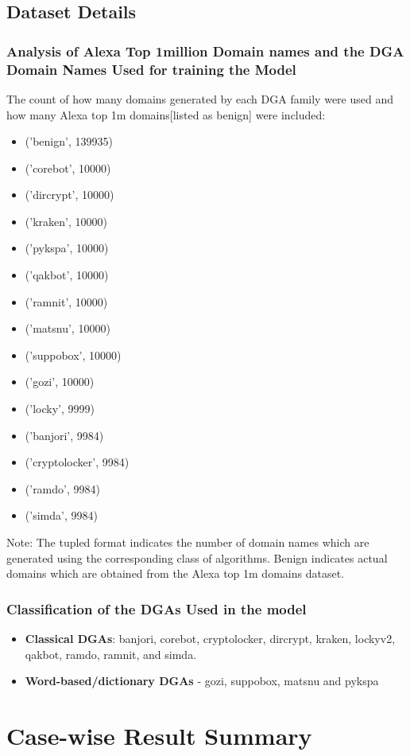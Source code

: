 \documentclass[conference]{IEEEtran}
\begin{document}
\subsection{Dataset Details}\label{AA}
\subsubsection{Analysis of Alexa Top 1million Domain names and the DGA Domain Names Used for training the Model}
The count of how many domains generated by each DGA family were used and how many Alexa top 1m domains[listed as benign] were included:
\begin{itemize}
\item ('benign', 139935)
\item ('corebot', 10000)
\item ('dircrypt', 10000)
\item ('kraken', 10000)
\item ('pykspa', 10000)
\item ('qakbot', 10000)
\item ('ramnit', 10000)
\item ('matsnu', 10000)
\item ('suppobox', 10000)
\item ('gozi', 10000)
\item ('locky', 9999)
\item ('banjori', 9984)
\item ('cryptolocker', 9984)
\item ('ramdo', 9984)
\item ('simda', 9984)
\end{itemize}
Note: The tupled format indicates the number of domain names which are generated using the corresponding class of algorithms. Benign indicates actual domains which are obtained from the Alexa top 1m domains dataset.
\subsubsection{Classification of the DGAs Used in the model}
\begin{itemize}
\item \textbf{Classical DGAs}: banjori, corebot, cryptolocker, dircrypt, kraken, lockyv2, qakbot, ramdo, ramnit, and simda.
\item \textbf{Word-based/dictionary DGAs} - gozi, suppobox, matsnu and pykspa 
\end{itemize}
\section{Case-wise Result Summary}
\end{document}
